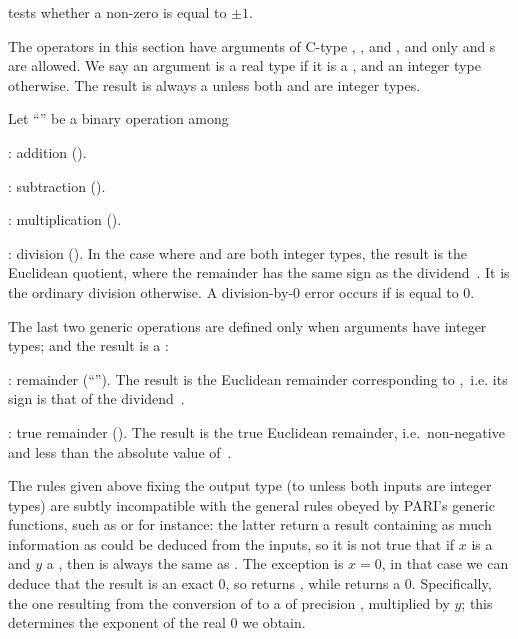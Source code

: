  tests whether a non-zero  
is equal to $\pm 1$.

\label{se:genbinop} The operators in this
section have arguments of C-type , , and , and
only  and  s are allowed. We say an argument is a
real type if it is a  , and an integer type otherwise. The
result is always a  unless both  and  are integer
types.

Let ``\op'' be a binary operation among

\item {}: addition ().

\item {}: subtraction ().

\item {}: multiplication ().

\item {}: division (). In the case where  and 
are both integer types, the result is the Euclidean quotient, where the
remainder has the same sign as the dividend~. It is the ordinary
division otherwise. A division-by-$0$ error occurs if  is equal to
$0$.

The last two generic operations are defined only when arguments have integer
types; and the result is a :

\item {}: remainder (``''). The result is the Euclidean
remainder corresponding to ,~i.e. its sign is that of the
dividend~.

\item {}: true remainder (). The result is the true
Euclidean remainder, i.e.~non-negative and less than the absolute value
of~.

 The rules given above fixing the output
type (to  unless both inputs are integer types) are subtly
incompatible with the general rules obeyed by PARI's generic functions, such
as  or  for instance: the latter return a result
containing as much information as could be deduced from the inputs, so it is
not true that if $x$ is a  and $y$ a , then
 is always the same as . The exception
is $x = 0$, in that case we can deduce that the result is an exact $0$,
so  returns , while  returns a
 $0$. Specifically, the one resulting from the conversion of
 to a  of precision , multiplied by
$y$; this determines the exponent of the real $0$ we obtain.

